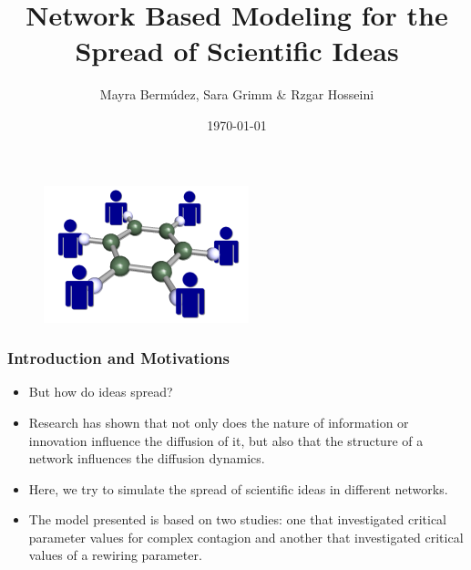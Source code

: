 \documentclass{beamer}
\title[Short title of the talk]{Network Based Modeling for the Spread of Scientific Ideas }
\author{Mayra Berm\'udez, Sara Grimm \& Rzgar Hosseini}
\institute[U of X]
{ ETH Zurich \\
\medskip
}
\date{\today}
\begin{document}
%
\begin{frame}
\titlepage
\end{frame}
%
\begin{frame}

\begin{figure}
[htp]
\begin{center}
\includegraphics{science_network_150}
\end{center}
\label {fig1}
\end{figure}
\end{frame}
%
\begin{frame}
\frametitle{Introduction and Motivations}
\begin{itemize}
\item But how do ideas spread? \pause
\item Research has shown that not only does the nature of information or innovation influence the diffusion of it, but also that the structure of a network influences the diffusion dynamics. \pause
\item Here, we try to simulate the spread of scientific ideas in different networks. \pause
\item The model presented is based on two studies: one that investigated critical parameter values for complex contagion and another that investigated critical values of a rewiring parameter.
\end{itemize}
\end{frame}
%
\end{document}
